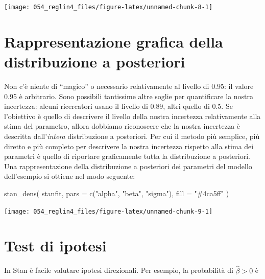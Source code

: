 \documentclass[
  10pt,
  italian,
  a4paper,
  extrafontsizes,onecolumn,openright
  ]{memoir}
\newenvironment{Shaded}{\begin{snugshade}}{\end{snugshade}}
\newcommand{\AttributeTok}[1]{\textcolor[rgb]{0.77,0.63,0.00}{#1}}
\newcommand{\FunctionTok}[1]{\textcolor[rgb]{0.00,0.00,0.00}{#1}}
\newcommand{\NormalTok}[1]{#1}
\newcommand{\StringTok}[1]{\textcolor[rgb]{0.31,0.60,0.02}{#1}}
\begin{document}
\begin{center}\texttt{[image: 054\_reglin4\_files/figure-latex/unnamed-chunk-8-1]} \end{center}

\hypertarget{rappresentazione-grafica-della-distribuzione-a-posteriori}{%
\section{Rappresentazione grafica della distribuzione a posteriori}\label{rappresentazione-grafica-della-distribuzione-a-posteriori}}

Non c'è niente di ``magico'' o necessario relativamente al livello di 0.95: il valore 0.95 è arbitrario. Sono possibili tantissime altre soglie per quantificare la nostra incertezza: alcuni ricercatori usano il livello di 0.89, altri quello di 0.5. Se l'obiettivo è quello di descrivere il livello della nostra incertezza relativamente alla stima del parametro, allora dobbiamo riconoscere che la nostra incertezza è descritta dall'\emph{intera} distribuzione a posteriori. Per cui il metodo più semplice, più diretto e più completo per descrivere la nostra incertezza rispetto alla stima dei parametri è quello di riportare graficamente tutta la distribuzione a posteriori. Una rappresentazione della distribuzione a posteriori dei parametri del modello dell'esempio si ottiene nel modo seguente:

\begin{Shaded}
\begin{Highlighting}[]
\FunctionTok{stan\_dens}\NormalTok{(}
\NormalTok{  stanfit, }
  \AttributeTok{pars =} \FunctionTok{c}\NormalTok{(}\StringTok{"alpha"}\NormalTok{, }\StringTok{"beta"}\NormalTok{, }\StringTok{"sigma"}\NormalTok{),}
  \AttributeTok{fill =} \StringTok{"\#4ca5ff"}
\NormalTok{)}
\end{Highlighting}
\end{Shaded}

\begin{center}\texttt{[image: 054\_reglin4\_files/figure-latex/unnamed-chunk-9-1]} \end{center}

\hypertarget{test-di-ipotesi}{%
\section{Test di ipotesi}\label{test-di-ipotesi}}

In Stan è facile valutare ipotesi direzionali. Per esempio, la probabilità di \(\hat{\beta} > 0\) è
\end{document}
